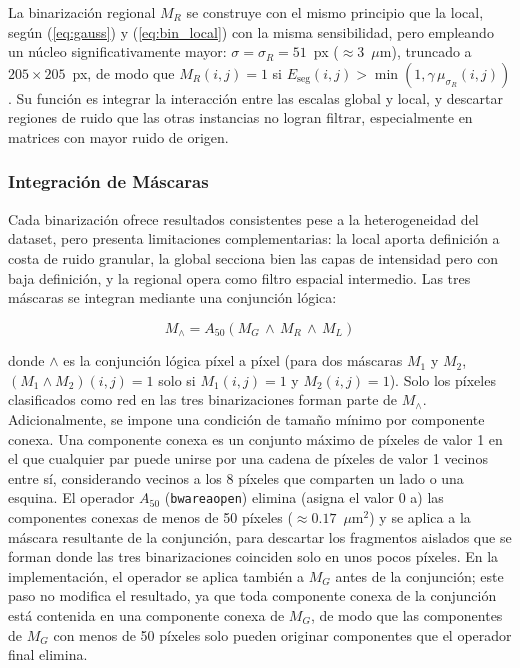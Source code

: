 La binarización regional $M_R$ se construye con el mismo principio que la local, según (\ref{eq:gauss}) y (\ref{eq:bin_local}) con la misma sensibilidad, pero empleando un núcleo significativamente mayor: $\sigma = \sigma_R = 51$~px ($\approx 3$~$\mu$m), truncado a $205\times205$~px, de modo que $M_R(i,j) = 1$ si $E_{\mathrm{seg}}(i,j) > \min(1, \gamma\, \mu_{\sigma_R}(i,j))$. Su función es integrar la interacción entre las escalas global y local, y descartar regiones de ruido que las otras instancias no logran filtrar, especialmente en matrices con mayor ruido de origen.

\subsubsection{Integración de Máscaras}

Cada binarización ofrece resultados consistentes pese a la heterogeneidad del dataset, pero presenta limitaciones complementarias: la local aporta definición a costa de ruido granular, la global secciona bien las capas de intensidad pero con baja definición, y la regional opera como filtro espacial intermedio. Las tres máscaras se integran mediante una conjunción lógica:

\begin{equation}
M_\wedge = A_{50}\left(M_G \,\wedge\, M_R \,\wedge\, M_L\right)
\label{eq:bin_conjuncion}
\end{equation}

donde $\wedge$ es la conjunción lógica píxel a píxel (para dos máscaras $M_1$ y $M_2$, $(M_1 \wedge M_2)(i,j) = 1$ solo si $M_1(i,j) = 1$ y $M_2(i,j) = 1$). Solo los píxeles clasificados como red en las tres binarizaciones forman parte de $M_\wedge$. Adicionalmente, se impone una condición de tamaño mínimo por componente conexa. Una componente conexa es un conjunto máximo de píxeles de valor 1 en el que cualquier par puede unirse por una cadena de píxeles de valor 1 vecinos entre sí, considerando vecinos a los 8 píxeles que comparten un lado o una esquina. El operador $A_{50}$ (\texttt{bwareaopen}) elimina (asigna el valor 0 a) las componentes conexas de menos de 50 píxeles ($\approx 0.17$~$\mu$m$^2$) y se aplica a la máscara resultante de la conjunción, para descartar los fragmentos aislados que se forman donde las tres binarizaciones coinciden solo en unos pocos píxeles. En la implementación, el operador se aplica también a $M_G$ antes de la conjunción; este paso no modifica el resultado, ya que toda componente conexa de la conjunción está contenida en una componente conexa de $M_G$, de modo que las componentes de $M_G$ con menos de 50 píxeles solo pueden originar componentes que el operador final elimina.

